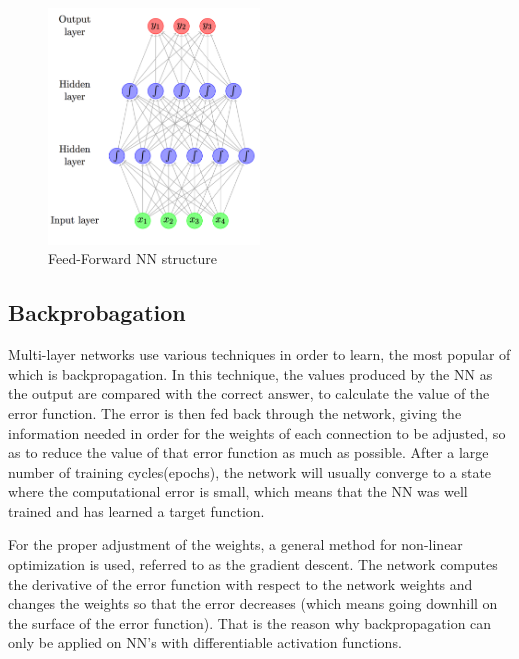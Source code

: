     \begin{figure}[h]
        \centering
        \includegraphics[width=0.50\textwidth]{media/Feed-forward-neural-network-with-two-hidden-layers.png}
        \caption{Feed-Forward NN structure}
        \label{fig:lstm}
    \end{figure}

    
    \subsection{Backprobagation}
    Multi-layer networks use various techniques in order to learn, the most popular of which is backpropagation. In this technique, the values produced by the NN as the output are compared with the correct answer, to calculate the value of the error function. The error is then fed back through the network, giving the information needed in order for the weights of each connection to be adjusted, so as to reduce the value of that error function as much as possible. After a large number of training cycles(epochs), the network will usually converge to a state where the computational error is small, which means that the NN was well trained and has learned a target function. 
    
    For the proper adjustment of the weights, a general method for non-linear optimization is used, referred to as the gradient descent. The network computes the derivative of the error function with respect to the network weights and changes the weights so that the error decreases (which means going downhill on the surface of the error function). That is the reason why backpropagation can only be applied on NN's with differentiable activation functions.

